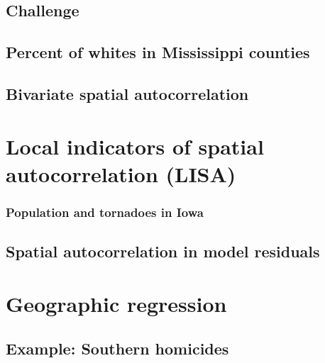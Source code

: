 \documentclass[]{book}
\begin{document}
\hypertarget{challenge}{%
\subsection{Challenge}\label{challenge}}

\hypertarget{percent-of-whites-in-mississippi-counties}{%
\subsection{Percent of whites in Mississippi counties}\label{percent-of-whites-in-mississippi-counties}}

\hypertarget{bivariate-spatial-autocorrelation}{%
\subsection{Bivariate spatial autocorrelation}\label{bivariate-spatial-autocorrelation}}

\hypertarget{local-indicators-of-spatial-autocorrelation-lisa}{%
\section{Local indicators of spatial autocorrelation (LISA)}\label{local-indicators-of-spatial-autocorrelation-lisa}}

\hypertarget{population-and-tornadoes-in-iowa}{%
\subsubsection{Population and tornadoes in Iowa}\label{population-and-tornadoes-in-iowa}}

\hypertarget{spatial-autocorrelation-in-model-residuals-1}{%
\subsection{Spatial autocorrelation in model residuals}\label{spatial-autocorrelation-in-model-residuals-1}}

\hypertarget{geographic-regression}{%
\section{Geographic regression}\label{geographic-regression}}

\hypertarget{example-southern-homicides}{%
\subsection{Example: Southern homicides}\label{example-southern-homicides}}
\end{document}
